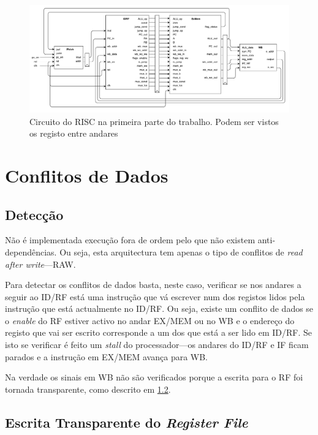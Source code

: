 \documentclass[a4paper]{article}
\begin{document}
		\begin{figure}[h]
			\centering
			\includegraphics[width=1.\textwidth]{img/circuit_pt1}
			\caption{Circuito do \textmu RISC na primeira parte do trabalho. Podem ser vistos os registo entre andares}
			\label{fig:circuit_pt1}
		\end{figure}
	
	\section{Conflitos de Dados}
	
	\subsection{Detecção}
	
	Não é implementada execução fora de ordem pelo que não existem anti-dependências. Ou seja, esta arquitectura tem apenas o tipo de conflitos de \textit{read after write}---RAW.
	
	Para detectar os conflitos de dados basta, neste caso, verificar se nos andares a seguir ao ID/RF está uma instrução que vá escrever num dos registos lidos pela instrução que está actualmente no ID/RF. Ou seja, existe um conflito de dados se o \textit{enable} do RF estiver activo no andar EX/MEM ou no WB e o endereço do registo que vai ser escrito corresponde a um dos que está a ser lido em ID/RF. Se isto se verificar é feito um \textit{stall} do processador---os andares do ID/RF e IF ficam parados e a instrução em EX/MEM avança para WB.
	
	Na verdade os sinais em WB não são verificados porque a escrita para o RF foi tornada transparente, como descrito em \ref{subsec:RF_write}.
	
	\subsection{Escrita Transparente do \textit{Register File}}
	\label{subsec:RF_write}
	
\end{document}
